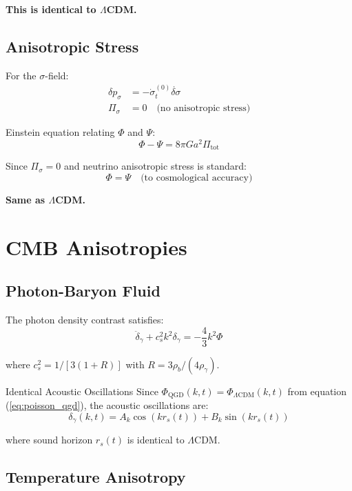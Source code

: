 \documentclass[11pt,a4paper]{article}
\theoremstyle{definition}
\theoremstyle{remark}
\begin{document}
	\textbf{This is identical to $\Lambda$CDM.}
	
	\subsection{Anisotropic Stress}
	
	For the $\sigma$-field:
	\begin{align}
		\delta p_\sigma &= -\dot{\sigma}_t^{(0)}\dot{\delta\sigma}\\
		\Pi_\sigma &= 0 \quad \text{(no anisotropic stress)}
	\end{align}
	
	Einstein equation relating $\Phi$ and $\Psi$:
	\begin{equation}
		\Phi - \Psi = 8\pi G a^2 \Pi_{\text{tot}}
	\end{equation}
	
	Since $\Pi_\sigma = 0$ and neutrino anisotropic stress is standard:
	\begin{equation}
		\boxed{\Phi = \Psi \quad \text{(to cosmological accuracy)}}
	\end{equation}
	
	\textbf{Same as $\Lambda$CDM.}
	
	\section{CMB Anisotropies}
	
	\subsection{Photon-Baryon Fluid}
	
	The photon density contrast satisfies:
	\begin{equation}
		\ddot{\delta}_\gamma + c_s^2 k^2 \delta_\gamma = -\frac{4}{3}k^2\Phi
	\end{equation}
	
	where $c_s^2 = 1/[3(1 + R)]$ with $R = 3\rho_b/(4\rho_\gamma)$.
	
	Identical Acoustic Oscillations
		Since $\Phi_{\text{QGD}}(k,t) = \Phi_{\Lambda\text{CDM}}(k,t)$ from equation (\ref{eq:poisson_qgd}), the acoustic oscillations are:
		\begin{equation}
			\delta_\gamma(k,t) = A_k\cos(kr_s(t)) + B_k\sin(kr_s(t))
		\end{equation}
		
		where sound horizon $r_s(t)$ is identical to $\Lambda$CDM.
	
	\subsection{Temperature Anisotropy}
	
\end{document}
